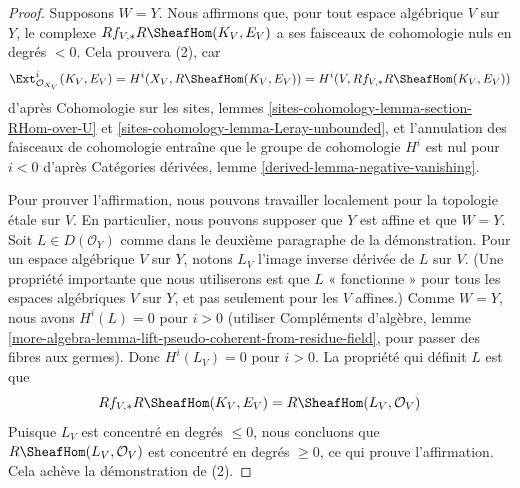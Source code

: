 \begin{proof}
\medskip\noindent
Supposons $W = Y$. Nous affirmons que, pour tout espace algébrique $V$ sur
$Y$, le complexe $Rf_{V, *}R\SheafHom(K_V, E_V)$ a ses faisceaux de
cohomologie nuls en degrés $< 0$. Cela prouvera (2), car
$$
\Ext^i_{\mathcal{O}_{X_V}}(K_V, E_V) =
H^i(X_V, R\SheafHom(K_V, E_V)) = 
H^i(V, Rf_{V, *}R\SheafHom(K_V, E_V))
$$
d'après Cohomologie sur les sites, lemmes
\ref{sites-cohomology-lemma-section-RHom-over-U} et
\ref{sites-cohomology-lemma-Leray-unbounded}, et l'annulation des faisceaux de
cohomologie entraîne que le groupe de cohomologie $H^i$ est nul pour $i < 0$
d'après Catégories dérivées, lemme
\ref{derived-lemma-negative-vanishing}.

\medskip\noindent
Pour prouver l'affirmation, nous pouvons travailler localement pour la
topologie \'etale sur $V$. En particulier, nous pouvons supposer que $Y$ est
affine et que $W = Y$.
Soit $L \in D(\mathcal{O}_Y)$ comme dans le deuxième paragraphe de la
démonstration. Pour un espace algébrique $V$ sur $Y$, notons $L_V$ l'image
inverse dérivée de $L$ sur $V$. (Une propriété importante que nous utiliserons
est que $L$ « fonctionne » pour tous les espaces algébriques $V$ sur $Y$, et
pas seulement pour les $V$ affines.)
Comme $W = Y$, nous avons $H^i(L) = 0$ pour $i > 0$
(utiliser Compléments d'algèbre, lemme
\ref{more-algebra-lemma-lift-pseudo-coherent-from-residue-field},
pour passer des fibres aux germes). Donc $H^i(L_V) = 0$ pour $i > 0$.
La propriété qui définit $L$ est que
$$
Rf_{V, *}R\SheafHom(K_V, E_V) = R\SheafHom(L_V, \mathcal{O}_V)
$$
Puisque $L_V$ est concentré en degrés $\leq 0$, nous concluons que
$R\SheafHom(L_V, \mathcal{O}_V)$ est concentré en degrés $\geq 0$, ce qui
prouve l'affirmation. Cela achève la démonstration de (2).


\end{proof}
